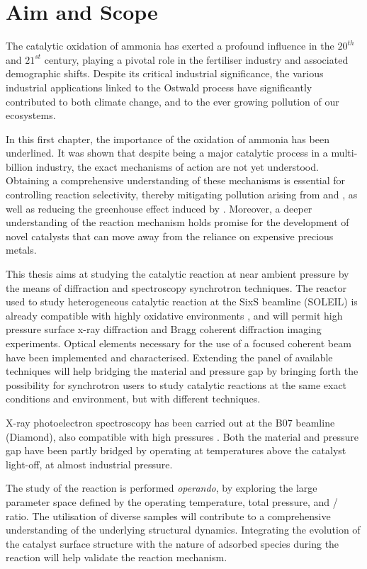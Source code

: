 \section{Aim and Scope}

The catalytic oxidation of ammonia has exerted a profound influence in the $20^{th}$ and $21^{st}$ century, playing a pivotal role in the fertiliser industry and associated demographic shifts.
Despite its critical industrial significance, the various industrial applications linked to the Ostwald process have significantly contributed to both climate change, and to the ever growing pollution of our ecosystems.

In this first chapter, the importance of the oxidation of ammonia has been underlined.
It was shown that despite being a major catalytic process in a multi-billion industry, the exact mechanisms of action are not yet understood.
Obtaining a comprehensive understanding of these mechanisms is essential for controlling reaction selectivity, thereby mitigating pollution arising from  and , as well as reducing the greenhouse effect induced by .
Moreover, a deeper understanding of the reaction mechanism holds promise for the development of novel catalysts that can move away from the reliance on expensive precious metals.

This thesis aims at studying the catalytic reaction at near ambient pressure by the means of diffraction and spectroscopy synchrotron techniques.
The reactor used to study heterogeneous catalytic reaction at the SixS beamline (SOLEIL) is already compatible with highly oxidative environments \parencite{VanRijn2010, Resta2020a}, and will permit high pressure surface x-ray diffraction and Bragg coherent diffraction imaging experiments.
Optical elements necessary for the use of a focused coherent beam have been implemented and characterised.
Extending the panel of available techniques will help bridging the material and pressure gap by bringing forth the possibility for synchrotron users to study catalytic reactions at the same exact conditions and environment, but with different techniques.

X-ray photoelectron spectroscopy has been carried out at the B07 beamline (Diamond), also compatible with high pressures \parencite{Held2020}.
Both the material and pressure gap have been partly bridged by operating at temperatures above the catalyst light-off, at almost industrial pressure.

The study of the reaction is performed \textit{operando}, by exploring the large parameter space defined by the operating temperature, total pressure, and / ratio.
The utilisation of diverse samples will contribute to a comprehensive understanding of the underlying structural dynamics.
Integrating the evolution of the catalyst surface structure with the nature of adsorbed species during the reaction will help validate the reaction mechanism.

